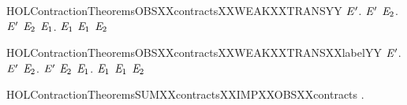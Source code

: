 \newcommand{\HOLContractionTheoremsOBSXXcontractsXXTRANSXXRIGHT}{\UseVerbatim{HOLContractionTheoremsOBSXXcontractsXXTRANSXXRIGHT}}
\begin{SaveVerbatim}{HOLContractionTheoremsOBSXXcontractsXXWEAKXXTRANSYY}
\HOLTokenTurnstile{} \HOLSymConst{\HOLTokenForall{}} \ensuremath{\HOLBoundVar{E}\sp{\prime{}}}.
       \ensuremath{\HOLBoundVar{E}\sp{\prime{}}} \HOLSymConst{\HOLTokenImp{}}
     \HOLSymConst{\HOLTokenForall{}} \ensuremath{\HOLBoundVar{E}\sb{\mathrm{2}}}. \ensuremath{\HOLBoundVar{E}\sp{\prime{}}} \HOLTokenWeakTransBegin{}\HOLTokenWeakTransEnd \ensuremath{\HOLBoundVar{E}\sb{\mathrm{2}}} \HOLSymConst{\HOLTokenImp{}} \HOLSymConst{\HOLTokenExists{}}\ensuremath{\HOLBoundVar{E}\sb{\mathrm{1}}}.  \HOLTokenWeakTransBegin{}\HOLTokenWeakTransEnd \ensuremath{\HOLBoundVar{E}\sb{\mathrm{1}}} \HOLSymConst{\HOLTokenConj{}}  \ensuremath{\HOLBoundVar{E}\sb{\mathrm{1}}} \ensuremath{\HOLBoundVar{E}\sb{\mathrm{2}}}
\end{SaveVerbatim}
\newcommand{\HOLContractionTheoremsOBSXXcontractsXXWEAKXXTRANSYY}{\UseVerbatim{HOLContractionTheoremsOBSXXcontractsXXWEAKXXTRANSYY}}
\begin{SaveVerbatim}{HOLContractionTheoremsOBSXXcontractsXXWEAKXXTRANSXXlabelYY}
\HOLTokenTurnstile{} \HOLSymConst{\HOLTokenForall{}} \ensuremath{\HOLBoundVar{E}\sp{\prime{}}}.
       \ensuremath{\HOLBoundVar{E}\sp{\prime{}}} \HOLSymConst{\HOLTokenImp{}}
     \HOLSymConst{\HOLTokenForall{}} \ensuremath{\HOLBoundVar{E}\sb{\mathrm{2}}}.
       \ensuremath{\HOLBoundVar{E}\sp{\prime{}}} \HOLTokenWeakTransBegin{} \HOLTokenWeakTransEnd \ensuremath{\HOLBoundVar{E}\sb{\mathrm{2}}} \HOLSymConst{\HOLTokenImp{}} \HOLSymConst{\HOLTokenExists{}}\ensuremath{\HOLBoundVar{E}\sb{\mathrm{1}}}.  \HOLTokenWeakTransBegin{} \HOLTokenWeakTransEnd \ensuremath{\HOLBoundVar{E}\sb{\mathrm{1}}} \HOLSymConst{\HOLTokenConj{}}  \ensuremath{\HOLBoundVar{E}\sb{\mathrm{1}}} \ensuremath{\HOLBoundVar{E}\sb{\mathrm{2}}}
\end{SaveVerbatim}
\newcommand{\HOLContractionTheoremsOBSXXcontractsXXWEAKXXTRANSXXlabelYY}{\UseVerbatim{HOLContractionTheoremsOBSXXcontractsXXWEAKXXTRANSXXlabelYY}}
\begin{SaveVerbatim}{HOLContractionTheoremsSUMXXcontractsXXIMPXXOBSXXcontracts}
\HOLTokenTurnstile{} \HOLSymConst{\HOLTokenForall{}} .
       \HOLSymConst{\HOLTokenConj{}}   \HOLSymConst{\HOLTokenImp{}}
        \HOLSymConst{\HOLTokenImp{}}
       
\end{SaveVerbatim}
